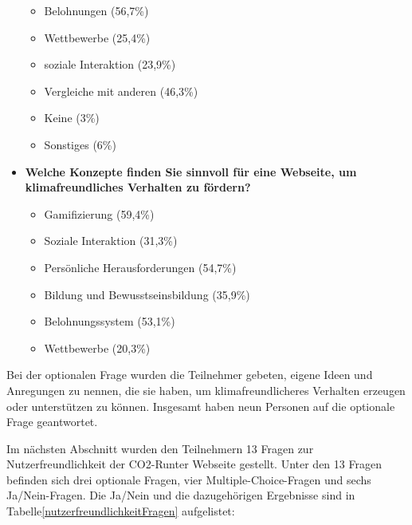 \begin{itemize}
\begin{itemize}
              \item Belohnungen (56,7\%)
              \item Wettbewerbe (25,4\%)
              \item soziale Interaktion (23,9\%)
              \item Vergleiche mit anderen (46,3\%)
              \item Keine (3\%)
              \item Sonstiges (6\%)
          \end{itemize}
    \item \textbf{Welche Konzepte finden Sie sinnvoll für eine Webseite, um klimafreundliches Verhalten zu fördern?}
          \begin{itemize}
              \item Gamifizierung (59,4\%)
              \item Soziale Interaktion (31,3\%)
              \item Persönliche Herausforderungen (54,7\%)
              \item Bildung und Bewusstseinsbildung (35,9\%)
              \item Belohnungssystem (53,1\%)
              \item Wettbewerbe (20,3\%)
          \end{itemize}
\end{itemize}

Bei der optionalen Frage wurden die Teilnehmer gebeten, eigene Ideen und Anregungen zu nennen, die sie haben, um klimafreundlicheres Verhalten erzeugen oder unterstützen zu können.
Insgesamt haben neun Personen auf die optionale Frage geantwortet.

Im nächsten Abschnitt wurden den Teilnehmern 13 Fragen zur Nutzerfreundlichkeit der CO2-Runter Webseite gestellt.
Unter den 13 Fragen befinden sich drei optionale Fragen, vier Multiple-Choice-Fragen und sechs Ja/Nein-Fragen.
Die Ja/Nein und die dazugehörigen Ergebnisse sind in Tabelle\ref{nutzerfreundlichkeitFragen} aufgelistet:

